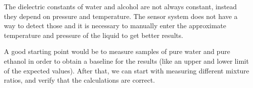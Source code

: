 The dielectric constants of water and alcohol are not always constant, instead they depend on pressure and temperature.
The sensor system does not have a way to detect those and it is necessary to manually enter the approximate temperature and pressure of the liquid to get better results.

A good starting point would be to measure samples of pure water and pure ethanol in order to obtain a baseline for the results (like an upper and lower limit of the expected values).
After that, we can start with measuring different mixture ratios, and verify that the calculations are correct.